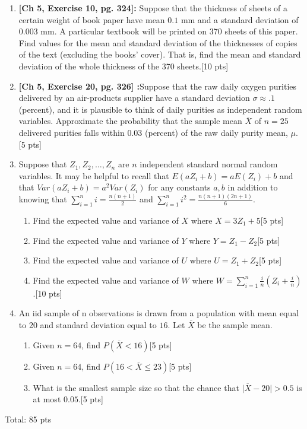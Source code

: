 \documentclass[11pt]{article}\usepackage[]{graphicx}\usepackage[]{color}
\begin{document}
\begin{enumerate}
    \item \textbf{ [Ch 5, Exercise 10, pg. 324]:} Suppose that the thickness of sheets of a certain weight of book paper have mean $0.1$ mm and a standard deviation of $0.003$ mm. A particular textbook will be printed on 370 sheets of this paper. Find  values for the mean and standard deviation of the thicknesses of copies of the text (excluding the books' cover). That is, find the mean and standard deviation of the whole thickness of the 370 sheets.[10 pts]
    
  
    
 \item \textbf{[Ch 5, Exercise 20, pg. 326] :}Suppose that the raw daily oxygen purities delivered by an air-products supplier have a standard deviation $\sigma \approx .1$ (percent), and it is plausible to think of daily purities as independent random variables. Approximate the probability that the sample mean $\overline{X}$ of $n = 25$ delivered purities falls within $0.03$ (percent) of the raw daily purity mean, $\mu$.[5 pts]   

  \item  Suppose that $Z_1, Z_2, \ldots, Z_n$ are $n$ independent standard normal random variables. It may be helpful to recall that $E(a Z_i + b) = a E(Z_i) + b$ and that $Var(a Z_i + b) = a^2 Var(Z_i)$ for any constants $a, b$ in addition to knowing that $\sum_{i=1}^{n} i = \frac{n(n+1)}{2}$ and $\sum_{i=1}^n i^2 = \frac{n(n+1)(2n+1)}{6}$.
        
        \begin{enumerate}
                \item Find the expected value and variance of $X$ where $X = 3 Z_1 + 5$[5 pts]
              
                 \item Find the expected value and variance of $Y$ where $Y = Z_1 - Z_2$[5 pts]
              
                 \item Find the expected value and variance of $U$ where $U = Z_1 + Z_2$[5 pts]
              
                 \item Find the expected value and variance of $W$ where $W = \sum_{i=1}^n \frac{i}{n} \left(Z_i + \frac{i}{n}\right)$.[10 pts]
        \end{enumerate}         

  \item An iid sample of n observations is drawn from a population with mean equal to 20 and standard deviation equal to $16$. Let $\overline{X}$ be the sample mean.
      \begin{enumerate}
            \item Given $n= 64$, find $P(\overline{X} < 16)$[5 pts]
            \item Given $n=64$, find $P(16 < \overline{X} \le 23)$[5 pts]
            \item What is the smallest sample size so that the chance that $\vert \overline{X} -20 \vert > 0.5$ is at most $0.05$.[5 pts]
            
            \end{enumerate}      

\end{enumerate}
Total: 85 pts
\end{document}

